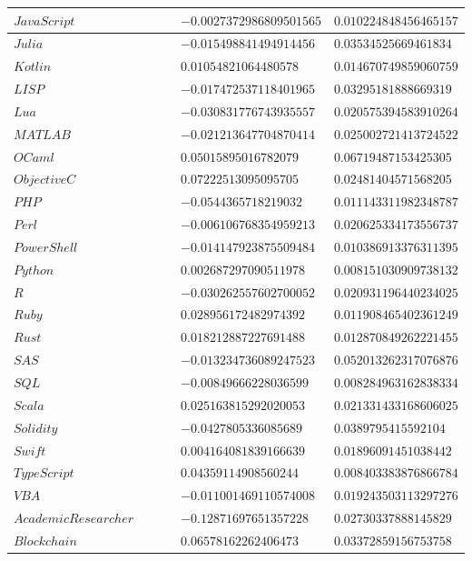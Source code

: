 \documentclass{report}
\begin{document}
\begin{longtable}{|R{0.4\linewidth}|R{0.3\linewidth}|R{0.3\linewidth}|}
  $JavaScript$ & $-0.0027372986809501565$ & $0.010224848456465157$\\
  \hline
  $Julia$ & $-0.015498841494914456$ & $0.03534525669461834$\\
  \hline
  $Kotlin$ & $0.01054821064480578$ & $0.014670749859060759$\\
  \hline
  $LISP$ & $-0.017472537118401965$ & $0.03295181888669319$\\
  \hline
  $Lua$ & $-0.030831776743935557$ & $0.020575394583910264$\\
  \hline
  $MATLAB$ & $-0.021213647704870414$ & $0.025002721413724522$\\
  \hline
  $OCaml$ & $0.05015895016782079$ & $0.06719487153425305$\\
  \hline
  $ObjectiveC$ & $0.07222513095095705$ & $0.02481404571568205$\\
  \hline
  $PHP$ & $-0.0544365718219032$ & $0.011143311982348787$\\
  \hline
  $Perl$ & $-0.006106768354959213$ & $0.020625334173556737$\\
  \hline
  $PowerShell$ & $-0.014147923875509484$ & $0.010386913376311395$\\
  \hline
  $Python$ & $0.002687297090511978$ & $0.008151030909738132$\\
  \hline
  $R$ & $-0.030262557602700052$ & $0.020931196440234025$\\
  \hline
  $Ruby$ & $0.028956172482974392$ & $0.011908465402361249$\\
  \hline
  $Rust$ & $0.018212887227691488$ & $0.012870849262221455$\\
  \hline
  $SAS$ & $-0.013234736089247523$ & $0.052013262317076876$\\
  \hline
  $SQL$ & $-0.00849666228036599$ & $0.008284963162838334$\\
  \hline
  $Scala$ & $0.025163815292020053$ & $0.021331433168606025$\\
  \hline
  $Solidity$ & $-0.0427805336085689$ & $0.0389795415592104$\\
  \hline
  $Swift$ & $0.004164081839166639$ & $0.01896091451038442$\\
  \hline
  $TypeScript$ & $0.04359114908560244$ & $0.008403383876866784$\\
  \hline
  $VBA$ & $-0.011001469110574008$ & $0.019243503113297276$\\
  \hline
  $AcademicResearcher$ & $-0.12871697651357228$ & $0.02730337888145829$\\
  \hline
  $Blockchain$ & $0.06578162262406473$ & $0.03372859156753758$\\

\end{longtable}
\end{document}
